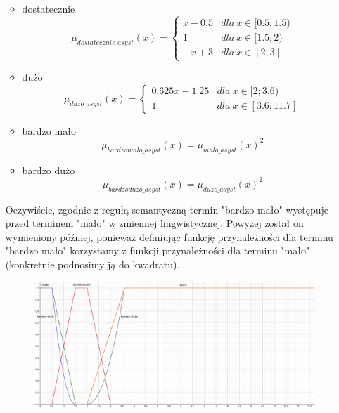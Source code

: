 \documentclass{classrep}
\begin{document}
\begin{enumerate}
\begin{itemize}
\begin{equation}
        \end{equation}
         \item dostatecznie
        \begin{equation}
            \mu_{dostatecznie\_asyst}(x) = \left\{\begin{matrix} x - 0.5 & dla \: x\in[0.5;1.5) \\ 1 & dla \: x\in [1.5; 2) \\ -x + 3 & dla \: x\in [2;3] \end{matrix}\right.
        \end{equation}
        \item dużo
        \begin{equation}
            \mu_{duzo\_asyst}(x) = \left\{\begin{matrix} 0.625x - 1.25 & dla \: x\in[2;3.6) \\ 1 & dla \: x\in [3.6; 11.7] \end{matrix}\right.
        \end{equation}
        \item bardzo mało
        \begin{equation}
            \mu_{bardzomalo\_asyst}(x) = \mu_{malo\_asyst}(x)^2
        \end{equation}
        \item bardzo dużo
        \begin{equation}
            \mu_{bardzoduzo\_asyst}(x) = \mu_{duzo\_asyst}(x)^2
        \end{equation}
    \end{itemize}
    Oczywiście, zgodnie z regułą semantyczną termin "bardzo mało" występuje przed terminem "mało" w zmiennej lingwistycznej. Powyżej został on wymieniony później, ponieważ definiując funkcję przynależności dla terminu "bardzo mało" korzystamy z funkcji przynależności dla terminu "mało" (konkretnie podnosimy ją do kwadratu).
    \begin{figure}[H]
        \centering
        \includegraphics[width=14cm]{wykres_asysty.png}

\end{figure}
\end{enumerate}
\end{document}
